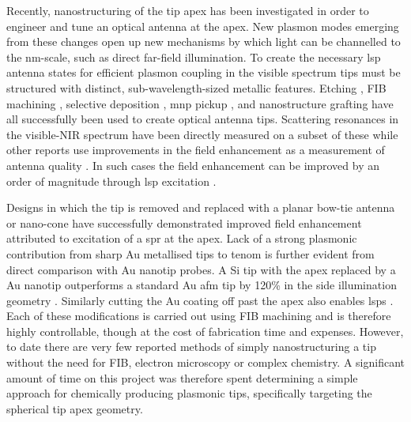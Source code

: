\documentclass{article}
\begin{document}
Recently, nanostructuring of the tip apex has been investigated in order to engineer and tune an optical antenna at the apex. New plasmon modes emerging from these changes open up new mechanisms by which light can be channelled to the nm-scale, such as direct far-field illumination. To create the necessary \gls{lsp} antenna states for efficient plasmon coupling in the visible spectrum tips must be structured with distinct, sub-wavelength-sized metallic features. Etching \cite{uebel2013, kharintsev2013}, FIB machining \cite{maouli2015}, selective deposition \cite{zou2009}, \gls{mnp} pickup \cite{denisyuk2012}, and nanostructure grafting \cite{huth2013} have all successfully been used to create optical antenna tips. Scattering resonances in the visible-NIR spectrum have been directly measured on a subset of these \cite{zou2009, maouli2015} while other reports use improvements in the field enhancement as a measurement of antenna quality \cite{umakoshi2012, huth2013, kharintsev2013}. In such cases the field enhancement can be improved by an order of magnitude through \gls{lsp} excitation \cite{umakoshi2012}.

Designs in which the tip is removed and replaced with a planar bow-tie antenna \cite{weber2010} or nano-cone \cite{fleischer2011} have successfully demonstrated improved field enhancement attributed to excitation of a \gls{spr} at the apex. Lack of a strong plasmonic contribution from sharp Au metallised tips to \gls{tenom} is further evident from direct comparison with Au nanotip probes. A Si tip with the apex replaced by a Au nanotip outperforms a standard Au \gls{afm} tip by 120\% in the side illumination geometry \cite{huth2013}. Similarly cutting the Au coating off past the apex also enables \glspl{lsp} \cite{zou2009}. Each of these modifications is carried out using FIB machining and is therefore highly controllable, though at the cost of fabrication time and expenses. However, to date there are very few reported methods of simply nanostructuring a tip without the need for FIB, electron microscopy or complex chemistry. A significant amount of time on this project was therefore spent determining a simple approach for chemically producing plasmonic tips, specifically targeting the spherical tip apex geometry.
\end{document}
